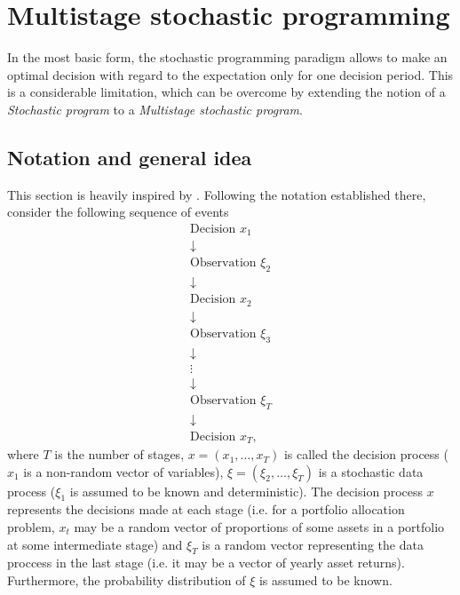 \section{Multistage stochastic programming}
In the most basic form, the stochastic programming paradigm allows to make an optimal decision with regard to the expectation only for one decision period. This is a considerable limitation, which can be overcome by extending the notion of a \textit{Stochastic program} to a \textit{Multistage stochastic program}.

\subsection{Notation and general idea}
This section is heavily inspired by \cite[Section 3.3.]{stochasticprogrammingbible}.
Following the notation established there, consider the following sequence of events
\begin{equation*}
\begin{gathered}
\mathrm{Decision} \, \, x_1
\\
\downarrow
\\
\mathrm{Observation} \,\, \xi_2
\\
\downarrow
\\
\mathrm{Decision} \,\, x_2
\\
\downarrow
\\
\mathrm{Observation} \,\, \xi_3
\\
\downarrow
\\
\vdots
\\
\downarrow
\\
\mathrm{Observation} \,\, \xi_T
\\
\downarrow
\\
\mathrm{Decision} \,\, x_T,
\end{gathered}
\end{equation*}
where $T$ is the number of stages, $x=(x_1,\dots,x_T)$ is called the decision process ($x_1$ is a non-random vector of variables), $\xi = (\xi_2,\dots,\xi_{T})$ is a stochastic data process ($\xi_1$ is assumed to be known and deterministic). The decision process $x$ represents the decisions made at each stage (i.e. for a portfolio allocation problem, $x_t$ may be a random vector of proportions of some assets in a portfolio at some intermediate stage) and $\xi_{T}$ is a random vector representing the data proccess in the last stage (i.e. it may be a vector of yearly asset returns). Furthermore, the probability distribution of $\xi$ is assumed to be known.

